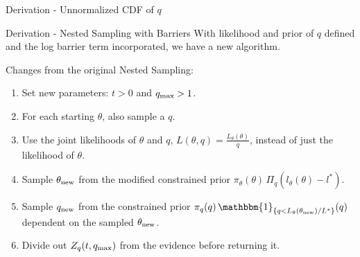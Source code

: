 \documentclass[]{beamer}
\begin{document}
  \begin{frame}{Derivation - Unnormalized CDF of $q$}
    \centering
  \end{frame}
  \begin{frame}{Derivation - Nested Sampling with Barriers}
    With likelihood and prior of $q$ defined and the log barrier term incorporated, we have a new algorithm.
    \pause

    Changes from the original Nested Sampling:
    \begin{enumerate}
      \item Set new parameters: $t > 0$ and $q_{\textnormal{max}} > 1$.\pause
      \item For each starting $\theta$, also sample a $q$.\pause
      \item Use the joint likelihoods of $\theta$ and $q$, $L(\theta, q) = \frac{L_\theta(\theta)}{q}$, instead of just the likelihood of $\theta$.\pause
      \item Sample $\theta_{\textnormal{new}}$ from the modified constrained prior $\pi_\theta(\theta) \, \Pi_q(l_\theta(\theta) - l^*)$.\pause
      \item Sample $q_{\textnormal{new}}$ from the constrained prior $\pi_q(q) \, \mathbbm{1}_{\{q < L_\theta(\theta_{\textnormal{new}}) / L^*\}}(q)$ dependent on the sampled $\theta_{\textnormal{new}}$.\pause
      \item Divide out $Z_q(t, q_{\textnormal{max}})$ from the evidence before returning it.
    \end{enumerate}
  \end{frame}
\end{document}
